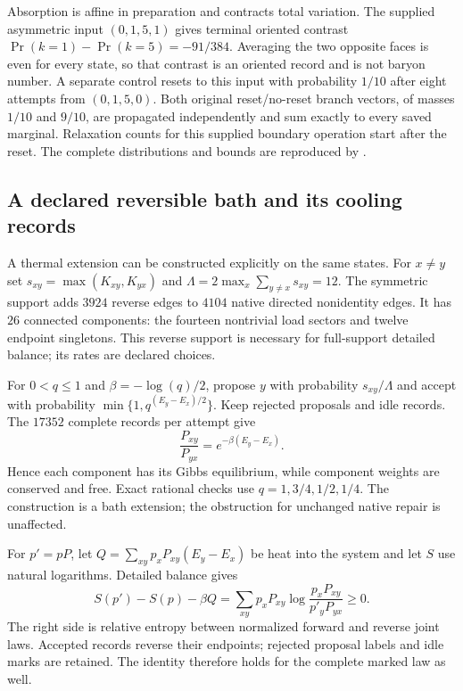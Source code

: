 Absorption is affine in preparation and contracts total variation.
The supplied asymmetric input $(0,1,5,1)$ gives terminal oriented
contrast $\Pr(k=1)-\Pr(k=5)=-91/384$. Averaging the two opposite faces
is even for every state, so that contrast is an oriented record and
is not baryon number. A separate control resets to this input with
probability $1/10$ after eight attempts from $(0,1,5,0)$. Both original
reset/no-reset branch vectors, of masses $1/10$ and $9/10$, are propagated
independently and sum exactly to every saved marginal. Relaxation counts
for this supplied boundary operation start after the reset.
The complete distributions and bounds are reproduced by
 \cite{ophrepo}.

\subsection{A declared reversible bath and its cooling records}

A thermal extension can be constructed explicitly on the same states.
For $x\ne y$ set $s_{xy}=\max(K_{xy},K_{yx})$ and
$\Lambda=2\max_x\sum_{y\ne x}s_{xy}=12$.
The symmetric support adds $3924$ reverse edges to $4104$ native directed
nonidentity edges. It has $26$ connected components: the fourteen
nontrivial load sectors and twelve endpoint singletons. This reverse
support is necessary for full-support detailed balance; its rates are
declared choices.

For $0<q\leq1$ and $\beta=-\log(q)/2$, propose $y$ with probability
$s_{xy}/\Lambda$ and accept with probability
$\min\{1,q^{(E_y-E_x)/2}\}$. Keep rejected proposals and idle records.
The $17352$ complete records per attempt give
\[
 \frac{P_{xy}}{P_{yx}}=e^{-\beta(E_y-E_x)}.
\]
Hence each component has its Gibbs equilibrium, while component weights
are conserved and free. Exact rational checks use
$q=1,3/4,1/2,1/4$. The construction is a bath extension; the obstruction
for unchanged native repair is unaffected.

For $p'=pP$, let $Q=\sum_{xy}p_xP_{xy}(E_y-E_x)$ be heat into the
system and let $S$ use natural logarithms. Detailed balance gives
\[
 S(p')-S(p)-\beta Q
 =\sum_{xy}p_xP_{xy}\log\frac{p_xP_{xy}}{p'_yP_{yx}}\geq0.
\]
The right side is relative entropy between normalized forward and
reverse joint laws. Accepted records reverse their endpoints; rejected
proposal labels and idle marks are retained. The identity therefore
holds for the complete marked law as well.

